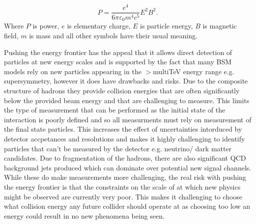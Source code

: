 \begin{equation}
\label{Eq:synchotron radiation}
P = \frac{e^4}{6\pi\varepsilon_0m^4c^5}E^2B^2.
\end{equation}
Where $P$ is power, $e$ is elementary charge, $E$ is particle energy, $B$ is magnetic field, $m$ is mass and all other symbols have their usual meaning.

Pushing the energy frontier has the appeal that it allows direct detection of particles at new energy scales and is supported by the fact that many \ac{BSM} models rely on new particles appearing in the $>$multiTeV energy range e.g. supersymmetry, however it does have drawbacks and risks. Due to the composite structure of hadrons they provide collision energies that are often significantly below the provided beam energy and that are challenging to measure. This limits the type of measurement that can be performed as the initial state of the interaction is poorly defined and so all measurments must rely on measurement of the final state particles. This increases the effect of uncertainties intorduced by detector accpetances and resolutions and makes it highly challenging to identify particles that can't be measured by the detector e.g. neutrino/ dark matter candidates. Due to fragmentation of the hadrons, there are also significant \ac{QCD} background jets produced which can dominate over potential new signal channels. While these do make measurements more challenging, the real risk with pushing the energy frontier is that the constraints on the scale of at which new physics might be observed are currently very poor. This makes it challenging to choose what collision energy any future collider should operate at as choosing too low an energy could result in no new phenomena being seen.

